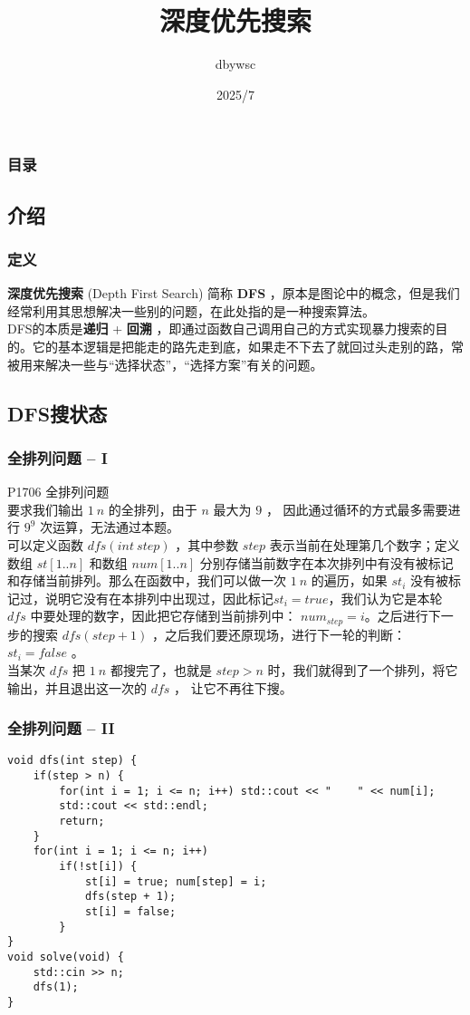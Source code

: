 \documentclass{beamer}
\title{深度优先搜索}
\author{dbywsc}
\date{2025/7}
\newcommand{\fdf}[1]{\alert{\textbf{#1}}}
\begin{document}
\frame{\titlepage}
\begin{frame}
	\frametitle{目录}
	\tableofcontents
\end{frame}
\begin{frame}
\section{介绍}
\frametitle{定义}
\fdf{深度优先搜索} (Depth First Search) 简称 \fdf{DFS} ，原本是图论中的概念，但是我们经常利用其思想解决一些别的问题，在此处指的是一种搜索算法。 \\
DFS的本质是\fdf{递归} + \fdf{回溯} ，即通过函数自己调用自己的方式实现暴力搜索的目的。它的基本逻辑是把能走的路先走到底，如果走不下去了就回过头走别的路，常被用来解决一些与“选择状态”，“选择方案”有关的问题。
\end{frame}
\begin{frame}
\section{DFS搜状态}
\frametitle{全排列问题 -- I}
P1706 全排列问题\\ 
要求我们输出 $1 ~ n$ 的全排列，由于 $n$ 最大为 $9$ ， 因此通过循环的方式最多需要进行 $9^9$ 次运算，无法通过本题。 \\ 
可以定义函数 $dfs(int \ step)$ ，其中参数 $step$ 表示当前在处理第几个数字；定义数组 $st[1..n]$ 和数组 $num[1..n]$ 分别存储当前数字在本次排列中有没有被标记和存储当前排列。那么在函数中，我们可以做一次 $1 ~ n$ 的遍历，如果 $st_i$ 没有被标记过，说明它没有在本排列中出现过，因此标记$st_i = true$，我们认为它是本轮 $dfs$ 中要处理的数字，因此把它存储到当前排列中： $num_{step} = i$。之后进行下一步的搜索 $dfs(step + 1)$ ，之后我们要还原现场，进行下一轮的判断： $st_i = false$ 。 \\ 
当某次 $dfs$ 把 $1 ~ n$ 都搜完了，也就是 $step > n$ 时，我们就得到了一个排列，将它输出，并且退出这一次的 $dfs$ ， 让它不再往下搜。
\end{frame}
\begin{frame}[fragile]
\frametitle{全排列问题 -- II}
\begin{onlyenv}
\begin{verbatim}
void dfs(int step) {
    if(step > n) {
        for(int i = 1; i <= n; i++) std::cout << "    " << num[i];
        std::cout << std::endl;
        return;
    }
    for(int i = 1; i <= n; i++)
        if(!st[i]) {
            st[i] = true; num[step] = i;
            dfs(step + 1);
            st[i] = false;
        }
}
void solve(void) {
    std::cin >> n;
    dfs(1);
}
\end{verbatim}
\end{onlyenv}
\end{frame}
\end{document}
